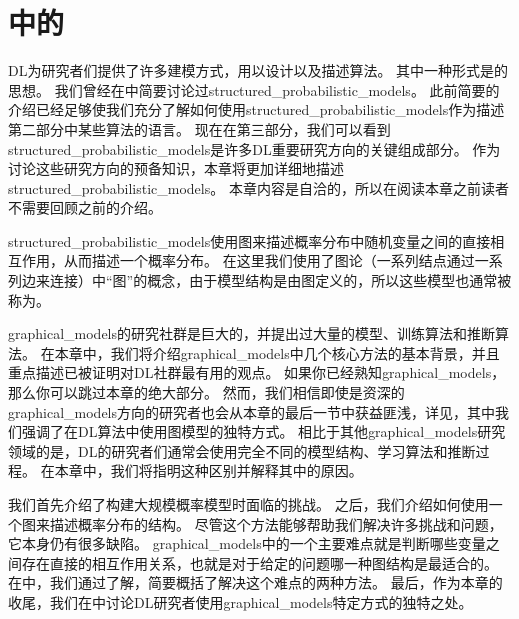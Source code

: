 \chapter{中的}
\label{chap:structured_probabilistic_models_for_deep_learning}


\gls{DL}为研究者们提供了许多建模方式，用以设计以及描述算法。
其中一种形式是的思想。
我们曾经在中简要讨论过\gls{structured_probabilistic_models}。
此前简要的介绍已经足够使我们充分了解如何使用\gls{structured_probabilistic_models}作为描述第二部分中某些算法的语言。
现在在第三部分，我们可以看到\gls{structured_probabilistic_models}是许多\gls{DL}重要研究方向的关键组成部分。
作为讨论这些研究方向的预备知识，本章将更加详细地描述\gls{structured_probabilistic_models}。
本章内容是自洽的，所以在阅读本章之前读者不需要回顾之前的介绍。


\gls{structured_probabilistic_models}使用图来描述概率分布中随机变量之间的直接相互作用，从而描述一个概率分布。
在这里我们使用了图论（一系列结点通过一系列边来连接）中``图''的概念，由于模型结构是由图定义的，所以这些模型也通常被称为。


\gls{graphical_models}的研究社群是巨大的，并提出过大量的模型、训练算法和推断算法。
在本章中，我们将介绍\gls{graphical_models}中几个核心方法的基本背景，并且重点描述已被证明对\gls{DL}社群最有用的观点。
如果你已经熟知\gls{graphical_models}，那么你可以跳过本章的绝大部分。
然而，我们相信即使是资深的\gls{graphical_models}方向的研究者也会从本章的最后一节中获益匪浅，详见，其中我们强调了在\gls{DL}算法中使用图模型的独特方式。
相比于其他\gls{graphical_models}研究领域的是，\gls{DL}的研究者们通常会使用完全不同的模型结构、学习算法和推断过程。
在本章中，我们将指明这种区别并解释其中的原因。


我们首先介绍了构建大规模概率模型时面临的挑战。
之后，我们介绍如何使用一个图来描述概率分布的结构。
尽管这个方法能够帮助我们解决许多挑战和问题，它本身仍有很多缺陷。
\gls{graphical_models}中的一个主要难点就是判断哪些变量之间存在直接的相互作用关系，也就是对于给定的问题哪一种图结构是最适合的。
在中，我们通过了解，简要概括了解决这个难点的两种方法。
最后，作为本章的收尾，我们在中讨论\gls{DL}研究者使用\gls{graphical_models}特定方式的独特之处。



